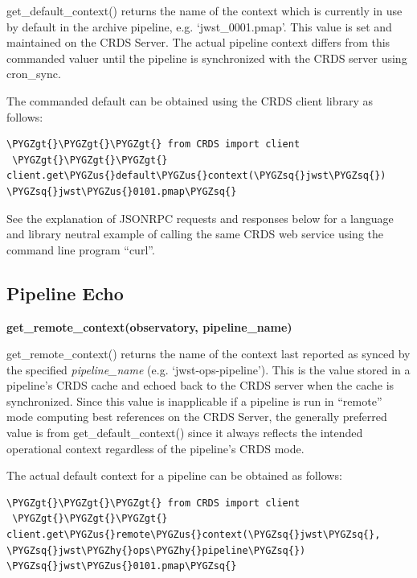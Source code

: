 \documentclass[letterpaper,10pt,english]{sphinxmanual}
\def\PYGZus{\char`\_}
\def\PYGZgt{\char`\>}
\def\PYGZhy{\char`\-}
\def\PYGZsq{\char`\'}
\renewcommand\PYGZsq{\textquotesingle}
\begin{document}
get\_default\_context() returns the name of the context which is
currently in use by default in the archive pipeline, e.g. `jwst\_0001.pmap'.
This value is set and maintained on the CRDS Server.   The actual pipeline context
differs from this commanded valuer until the pipeline is synchronized with the CRDS
server using cron\_sync.

The commanded default can be obtained using the CRDS client library as follows:

\begin{Verbatim}[commandchars=\\\{\}]
 \PYGZgt{}\PYGZgt{}\PYGZgt{} from CRDS import client
 \PYGZgt{}\PYGZgt{}\PYGZgt{} client.get\PYGZus{}default\PYGZus{}context(\PYGZsq{}jwst\PYGZsq{})
\PYGZsq{}jwst\PYGZus{}0101.pmap\PYGZsq{}
\end{Verbatim}

See the explanation of JSONRPC requests and responses below for a language and library
neutral example of calling the same CRDS web service using the command line program ``curl''.


\subsection{Pipeline Echo}
\label{web_services:pipeline-echo}
\textbf{get\_remote\_context(observatory, pipeline\_name)}

get\_remote\_context() returns the name of the context last reported as
synced by the specified \emph{pipeline\_name} (e.g. `jwst-ops-pipeline').  This is
the value stored in a pipeline's CRDS cache and echoed back to the CRDS server
when the cache is synchronized.  Since this value is inapplicable if a pipeline
is run in ``remote'' mode computing best references on the CRDS Server, the
generally preferred value is from get\_default\_context() since it always
reflects the intended operational context regardless of the pipeline's CRDS
mode.

The actual default context for a pipeline can be obtained as follows:

\begin{Verbatim}[commandchars=\\\{\}]
 \PYGZgt{}\PYGZgt{}\PYGZgt{} from CRDS import client
 \PYGZgt{}\PYGZgt{}\PYGZgt{} client.get\PYGZus{}remote\PYGZus{}context(\PYGZsq{}jwst\PYGZsq{}, \PYGZsq{}jwst\PYGZhy{}ops\PYGZhy{}pipeline\PYGZsq{})
\PYGZsq{}jwst\PYGZus{}0101.pmap\PYGZsq{}
\end{Verbatim}
\end{document}
